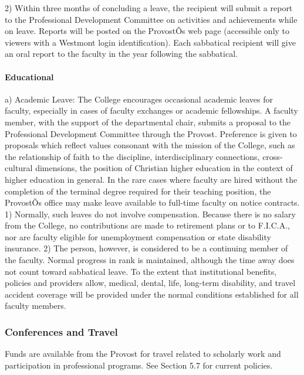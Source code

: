 \documentclass[letterpaper, 11pt]{article}
\begin{document}
				2) Within three months of concluding a leave, the recipient will submit a report to the Professional Development Committee on activities and achievements while on leave.  Reports will be posted on the ProvostÕs web page (accessible only to viewers with a Westmont login identification).  Each sabbatical recipient will give an oral report to the faculty in the year following the sabbatical.
			\paragraph{Educational}
				a) Academic Leave:  The College encourages occasional academic leaves for faculty, especially in cases of faculty exchanges or academic fellowships.  A faculty member, with the support of the departmental chair, submits a proposal to the Professional Development Committee through the Provost.  Preference is given to proposals which reflect values consonant with the mission of the College, such as the relationship of faith to the discipline, interdisciplinary connections, cross-cultural dimensions, the position of Christian higher education in the context of higher education in general.  In the rare cases where faculty are hired without the completion of the terminal degree required for their teaching position, the ProvostÕs office may make leave available to full-time faculty on notice contracts.
				1) Normally, such leaves do not involve compensation.  Because there is no salary from the College, no contributions are made to retirement plans or to F.I.C.A., nor are faculty eligible for unemployment compensation or state disability insurance.
				2) The person, however, is considered to be a continuing member of the faculty. Normal progress in rank is maintained, although the time away does not count toward sabbatical leave.  To the extent that institutional benefits, policies and providers allow, medical, dental, life, long-term disability, and travel accident coverage will be provided under the normal conditions established for all faculty members.
		\subsubsection{Conferences and Travel}
			Funds are available from the Provost for travel related to scholarly work and participation in professional programs.  See Section 5.7 for current policies.
\end{document}
